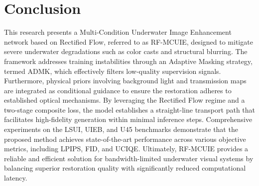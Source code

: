 \section{Conclusion}
\label{sec:conclusion}

This research presents a Multi-Condition Underwater Image Enhancement network based on Rectified Flow, referred to as RF-MCUIE, designed to mitigate severe underwater degradations such as color casts and structural blurring. The framework addresses training instabilities through an Adaptive Masking strategy, termed ADMK, which effectively filters low-quality supervision signals. Furthermore, physical priors involving background light and transmission maps are integrated as conditional guidance to ensure the restoration adheres to established optical mechanisms. By leveraging the Rectified Flow regime and a two-stage composite loss, the model establishes a straight-line transport path that facilitates high-fidelity generation within minimal inference steps. Comprehensive experiments on the LSUI, UIEB, and U45 benchmarks demonstrate that the proposed method achieves state-of-the-art performance across various objective metrics, including LPIPS, FID, and UCIQE. Ultimately, RF-MCUIE provides a reliable and efficient solution for bandwidth-limited underwater visual systems by balancing superior restoration quality with significantly reduced computational latency.
